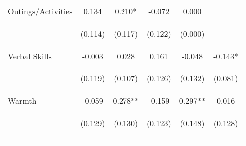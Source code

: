\begin{tabular}{lccccc}
\noalign{\smallskip}Outings/Activities & 0.134 & 0.210* & -0.072 & 0.000 & \\
 & \begin{footnotesize}(0.114)\end{footnotesize} & \begin{footnotesize}(0.117)\end{footnotesize} & \begin{footnotesize}(0.122)\end{footnotesize} & \begin{footnotesize}(0.000)\end{footnotesize} & \begin{footnotesize}\end{footnotesize}\\
\noalign{\smallskip}Verbal Skills & -0.003 & 0.028 & 0.161 & -0.048 & -0.143*\\
 & \begin{footnotesize}(0.119)\end{footnotesize} & \begin{footnotesize}(0.107)\end{footnotesize} & \begin{footnotesize}(0.126)\end{footnotesize} & \begin{footnotesize}(0.132)\end{footnotesize} & \begin{footnotesize}(0.081)\end{footnotesize}\\
\noalign{\smallskip}Warmth & -0.059 & 0.278** & -0.159 & 0.297** & 0.016\\
 & \begin{footnotesize}(0.129)\end{footnotesize} & \begin{footnotesize}(0.130)\end{footnotesize} & \begin{footnotesize}(0.123)\end{footnotesize} & \begin{footnotesize}(0.148)\end{footnotesize} & \begin{footnotesize}(0.128)\end{footnotesize}\\
\noalign{\smallskip}\hline\end{tabular}\\
